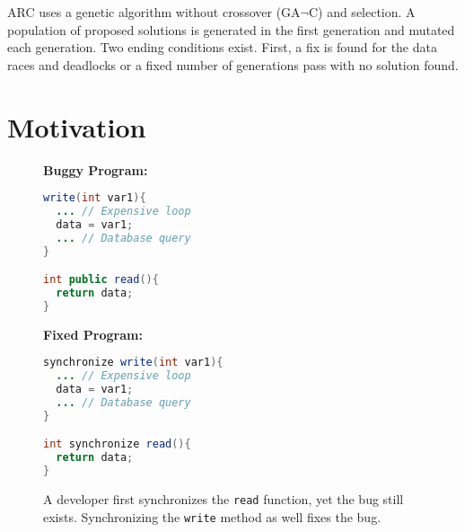 \documentclass[runningheads,a4paper]{llncs}
\begin{document}
ARC uses a genetic algorithm without crossover (GA$\neg$C) and selection. A population of proposed solutions is generated in the first generation and mutated each generation. Two ending conditions exist.  First, a fix is found for the data races and deadlocks or a fixed number of generations pass with no solution found.



\section{Motivation}
\label{sec:motivation}

\begin{figure}[t!]
\begin{minipage}{5cm}
\footnotesize{\textbf{Buggy Program:}}
\begin{lstlisting}[language=Java, morekeywords={synchronize}]
write(int var1){
  ... // Expensive loop
  data = var1;
  ... // Database query
}

int public read(){
  return data;
}
\end{lstlisting}
\end{minipage}\hfill
\begin{minipage}{5cm}
\footnotesize{\textbf{Fixed Program:}}
\begin{lstlisting}[language=Java, morekeywords={synchronize}]
synchronize write(int var1){
  ... // Expensive loop
  data = var1;
  ... // Database query
}

int synchronize read(){
  return data;
}
\end{lstlisting}
\end{minipage}
\caption{A developer first synchronizes the \texttt{read} function, yet the bug
still exists. Synchronizing the \texttt{write} method as well fixes the bug.}
\label{fig:fixed_sample_datarace}
\end{figure}
\end{document}
